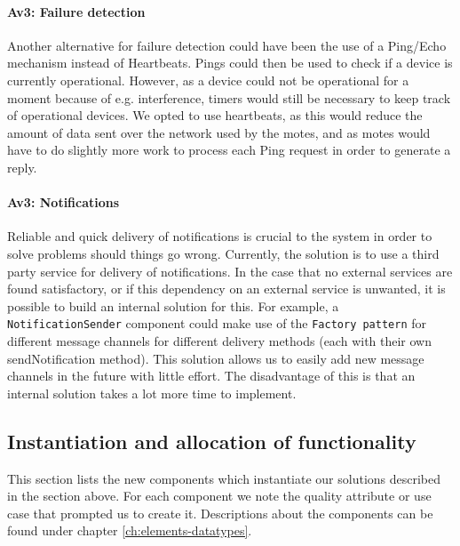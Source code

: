         \paragraph{Av3: Failure detection}
            Another alternative for failure detection could have been the use of
            a Ping/Echo mechanism instead of Heartbeats. Pings could then be used
            to check if a device is currently operational. However, as a device could
            not be operational for a moment because of e.g. interference, timers
            would still be necessary to keep track of operational devices. We opted
            to use heartbeats, as this would reduce the amount of data sent over
            the network used by the motes, and as motes would have to do slightly
            more work to process each Ping request in order to generate a reply.

        \paragraph{Av3: Notifications}
            Reliable and quick delivery of notifications is crucial to the
            system in order to solve problems should things go wrong. Currently,
            the solution is to use a third party service for delivery of
            notifications. In the case that no external services are found
            satisfactory, or if this dependency on an external service is
            unwanted, it is possible to build an internal solution for this.
            For example, a \texttt{NotificationSender} component could make use
            of the \texttt{Factory pattern} for different message channels for
            different delivery methods (each with their own sendNotification method).
            This solution allows us to easily add new message channels in the
            future with little effort. The disadvantage of this is that an
            internal solution takes a lot more time to implement.


\subsection{Instantiation and allocation of functionality}
    This section lists the new components which instantiate our solutions
    described in the section above. For each component we note the quality
    attribute or use case that prompted us to create it. Descriptions about
    the components can be found under chapter \ref{ch:elements-datatypes}. \\

